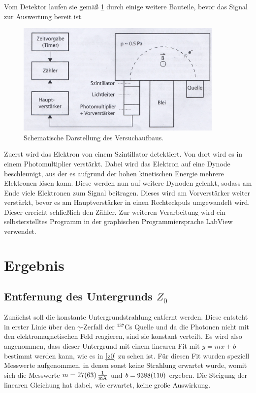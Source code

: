 Vom Detektor laufen sie gemäß \cref{aufbau} durch einige weitere Bauteile, bevor das Signal zur Auswertung bereit ist.

\begin{figure}[p]
	\centering
	\includegraphics[width=0.9\textwidth]{Aufbau.jpg}
	\caption{Schematische Darstellung des Versuchaufbaus. \cite[27]{anleitung-ws2014}}
	\label{aufbau}
\end{figure}

Zuerst wird das Elektron von einem Szintillator detektiert. Von dort wird es in einem Photomultiplier verstärkt. Dabei wird das Elektron auf eine Dynode beschleunigt, aus der es aufgrund der hohen kinetischen Energie mehrere Elektronen lösen kann. Diese werden nun auf weitere Dynoden gelenkt, sodass am Ende viele Elektronen zum Signal beitragen. Dieses wird am Vorverstärker weiter verstärkt, bevor es am Hauptverstärker in einen Rechteckpuls umgewandelt wird. Dieser erreicht schließlich den Zähler. Zur weiteren Verarbeitung wird ein selbsterstelltes Programm in der graphischen Programmiersprache LabView verwendet.

\newpage
\section{Ergebnis}
\subsection{Entfernung des Untergrunds $Z_{0}$}
Zunächst soll die konstante Untergrundstrahlung entfernt werden. Diese entsteht in erster Linie über den $\gamma$-Zerfall der $^{137}$Cs Quelle und da die Photonen nicht mit den elektromagnetischen Feld reagieren, sind sie konstant verteilt. Es wird also angenommen, dass dieser Untergrund mit einem linearen Fit mit $y = mx +b$ bestimmt werden kann, wie es in \cref{z0} zu sehen ist. Für diesen Fit wurden speziell Messwerte aufgenommen, in denen sonst keine Strahlung erwartet wurde, womit sich die Messwerte $m = \SI{27 \pm 63}{\frac{1}{mA}}$ und $b = \SI{9388 \pm 110}{}$ ergeben. Die Steigung der linearen Gleichung hat dabei, wie erwartet, keine große Auswirkung.

